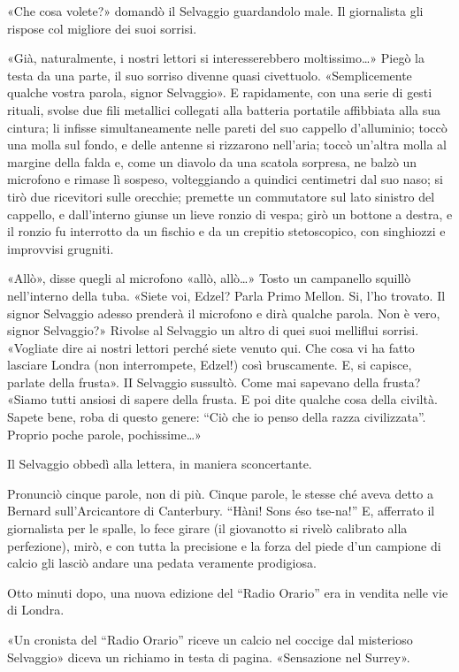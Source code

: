 \documentclass[
a5paper, %
10pt, %
twoside, 
onecolumn, %
openany, %
]{memoir}
\begin{document}
«Che cosa volete?» domandò il Selvaggio guardandolo male. Il giornalista gli rispose col migliore dei suoi sorrisi.

«Già, naturalmente, i nostri lettori si interesserebbero moltissimo…» Piegò la testa da una parte, il suo sorriso divenne quasi civettuolo. «Semplicemente qualche vostra parola, signor Selvaggio». E rapidamente, con una serie di gesti rituali, svolse due fili metallici collegati alla batteria portatile affibbiata alla sua cintura; li infisse simultaneamente nelle pareti del suo cappello d’alluminio; toccò una molla sul fondo, e delle antenne si rizzarono nell’aria; toccò un’altra molla al margine della falda e, come un diavolo da una scatola sorpresa, ne balzò un microfono e rimase lì sospeso, volteggiando a quindici centimetri dal suo naso; si tirò due ricevitori sulle orecchie; premette un commutatore sul lato sinistro del cappello, e dall’interno giunse un lieve ronzio di vespa; girò un bottone a destra, e il ronzio fu interrotto da un fischio e da un crepitio stetoscopico, con singhiozzi e improvvisi grugniti.

«Allò», disse quegli al microfono «allò, allò…» Tosto un campanello squillò nell’interno della tuba. «Siete voi, Edzel? Parla Primo Mellon. Si, l’ho trovato. Il signor Selvaggio adesso prenderà il microfono e dirà qualche parola. Non è vero, signor Selvaggio?» Rivolse al Selvaggio un altro di quei suoi melliflui sorrisi. «Vogliate dire ai nostri lettori perché siete venuto qui. Che cosa vi ha fatto lasciare Londra (non interrompete, Edzel!) così bruscamente. E, si capisce, parlate della frusta». II Selvaggio sussultò. Come mai sapevano della frusta? «Siamo tutti ansiosi di sapere della frusta. E poi dite qualche cosa della civiltà. Sapete bene, roba di questo genere: “Ciò che io penso della razza civilizzata”. Proprio poche parole, pochissime…»

Il Selvaggio obbedì alla lettera, in maniera sconcertante.

Pronunciò cinque parole, non di più. Cinque parole, le stesse ché aveva detto a Bernard sull’Arcicantore di Canterbury. “Hàni! Sons éso tse-na!” E, afferrato il giornalista per le spalle, lo fece girare (il giovanotto si rivelò calibrato alla perfezione), mirò, e con tutta la precisione e la forza del piede d’un campione di calcio gli lasciò andare una pedata veramente prodigiosa.

Otto minuti dopo, una nuova edizione del “Radio Orario” era in vendita nelle vie di Londra.

«Un cronista del “Radio Orario” riceve un calcio nel coccige dal misterioso Selvaggio» diceva un richiamo in testa di pagina. «Sensazione nel Surrey».
\end{document}
